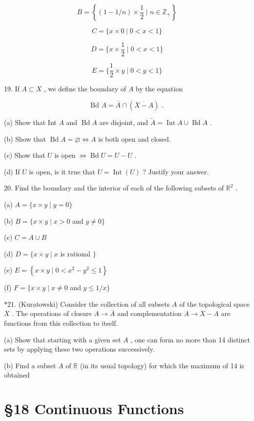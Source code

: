 \documentclass[10pt]{article}
\begin{document}
\[
B = \left\{  {\left( {1 - 1/n}\right)  \times  \frac{1}{2} \mid  n \in  {\mathbb{Z}}_{ + }}\right\}
\]

\[
C = \{ x \times  0 \mid  0 < x < 1\}
\]

\[
D = \{ x \times  \frac{1}{2} \mid  0 < x < 1\}
\]

\[
E = \{ \frac{1}{2} \times  y \mid  0 < y < 1\}
\]

19. If \(A \subset  X\) , we define the boundary of \(A\) by the equation

\[
\text{ Bd }A = \bar{A} \cap  \left( \overline{X - A}\right) \text{ . }
\]

(a) Show that Int \(A\) and \(\operatorname{Bd}A\) are disjoint, and \(\widetilde{A} = \operatorname{Int}A \cup  \operatorname{Bd}A\) .

(b) Show that \(\operatorname{Bd}A = \varnothing  \Leftrightarrow  A\) is both open and closed.

(c) Show that \(U\) is open \(\Leftrightarrow  \operatorname{Bd}U = U - U\) .

(d) If \(U\) is open, is it true that \(U = \operatorname{Int}\left( U\right)\) ? Justify your answer.

20. Find the boundary and the interior of each of the following subsets of \({\mathbb{R}}^{2}\) .

(a) \(A = \{ x \times  y \mid  y = 0\}\)

(b) \(B = \{ x \times  y \mid  x > 0\) and \(y \neq  0\}\)

(c) \(C = A \cup  B\)

(d) \(D = \{ x \times  y \mid  x\) is rational \(\}\)

(e) \(E = \left\{  {x \times  y \mid  0 < {x}^{2} - {y}^{2} \leq  1}\right\}\)

(f) \(F = \{ x \times  y \mid  x \neq  0\) and \(y \leq  1/x\}\)

*21. (Kuratowski) Consider the collection of all subsets \(A\) of the topological space \(X\) . The operations of closure \(A \rightarrow  \bar{A}\) and complementation \(A \rightarrow  X - A\) are functions from this collection to itself.

(a) Show that starting with a given set \(A\) , one can form no more than 14 distinct sets by applying these two operations successively.

(b) Find a subset \(A\) of \(\mathbb{R}\) (in its usual topology) for which the maximum of 14 is obtained

\section*{§18 Continuous Functions}
\end{document}
